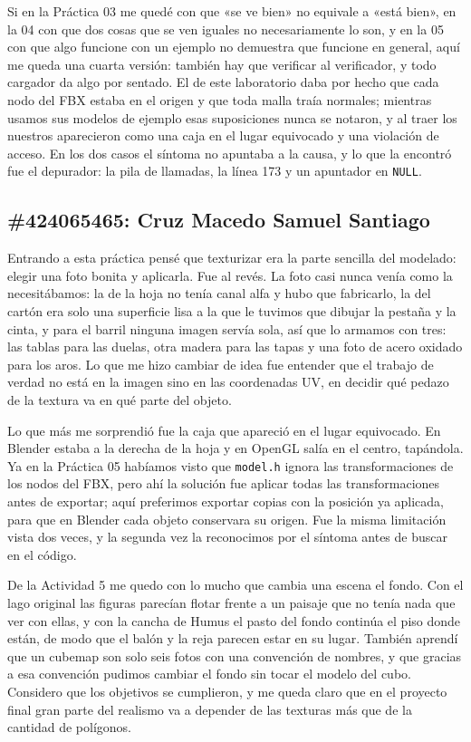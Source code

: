 Si en la Práctica 03 me quedé con que «se ve bien» no equivale a «está bien», en la 04 con que dos cosas que se ven iguales no necesariamente lo son, y en la 05 con que algo funcione con un ejemplo no demuestra que funcione en general, aquí me queda una cuarta versión: también hay que verificar al verificador, y todo cargador da algo por sentado. El de este laboratorio daba por hecho que cada nodo del FBX estaba en el origen y que toda malla traía normales; mientras usamos sus modelos de ejemplo esas suposiciones nunca se notaron, y al traer los nuestros aparecieron como una caja en el lugar equivocado y una violación de acceso. En los dos casos el síntoma no apuntaba a la causa, y lo que la encontró fue el depurador: la pila de llamadas, la línea 173 y un apuntador en \texttt{NULL}.

\subsection*{\#424065465: Cruz Macedo Samuel Santiago}
Entrando a esta práctica pensé que texturizar era la parte sencilla del modelado: elegir una foto bonita y aplicarla. Fue al revés. La foto casi nunca venía como la necesitábamos: la de la hoja no tenía canal alfa y hubo que fabricarlo, la del cartón era solo una superficie lisa a la que le tuvimos que dibujar la pestaña y la cinta, y para el barril ninguna imagen servía sola, así que lo armamos con tres: las tablas para las duelas, otra madera para las tapas y una foto de acero oxidado para los aros. Lo que me hizo cambiar de idea fue entender que el trabajo de verdad no está en la imagen sino en las coordenadas UV, en decidir qué pedazo de la textura va en qué parte del objeto.

Lo que más me sorprendió fue la caja que apareció en el lugar equivocado. En Blender estaba a la derecha de la hoja y en OpenGL salía en el centro, tapándola. Ya en la Práctica 05 habíamos visto que \texttt{model.h} ignora las transformaciones de los nodos del FBX, pero ahí la solución fue aplicar todas las transformaciones antes de exportar; aquí preferimos exportar copias con la posición ya aplicada, para que en Blender cada objeto conservara su origen. Fue la misma limitación vista dos veces, y la segunda vez la reconocimos por el síntoma antes de buscar en el código.

De la Actividad 5 me quedo con lo mucho que cambia una escena el fondo. Con el lago original las figuras parecían flotar frente a un paisaje que no tenía nada que ver con ellas, y con la cancha de Humus el pasto del fondo continúa el piso donde están, de modo que el balón y la reja parecen estar en su lugar. También aprendí que un cubemap son solo seis fotos con una convención de nombres, y que gracias a esa convención pudimos cambiar el fondo sin tocar el modelo del cubo. Considero que los objetivos se cumplieron, y me queda claro que en el proyecto final gran parte del realismo va a depender de las texturas más que de la cantidad de polígonos.

